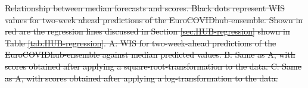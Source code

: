 \documentclass[10pt,letterpaper]{article} %
\providecommand{\DIFdeltex}[1]{{\protect\color{red}\sout{#1}}}                      %
\providecommand{\DIFdelbegin}{} %
\providecommand{\DIFdelFL}[1]{\DIFdel{#1}} %
\providecommand{\DIFdel}[1]{\texorpdfstring{\DIFdeltex{#1}}{}} %
\newcommand{\DIFscaledelfig}{0.5}
\newlength{\DIFdelgraphicswidth} %
\newlength{\DIFdelgraphicsheight} %
\newcommand{\DIFdelincludegraphics}[2][]{%
\sbox{\DIFdelgraphicsbox}{\DIFOincludegraphics[#1]{#2}}%
\settoboxwidth{\DIFdelgraphicswidth}{\DIFdelgraphicsbox} %
\settoboxtotalheight{\DIFdelgraphicsheight}{\DIFdelgraphicsbox} %
\scalebox{\DIFscaledelfig}{%
\parbox[b]{\DIFdelgraphicswidth}{\usebox{\DIFdelgraphicsbox}\\[-\baselineskip] \rule{\DIFdelgraphicswidth}{0em}}\llap{\resizebox{\DIFdelgraphicswidth}{\DIFdelgraphicsheight}{%
\setlength{\unitlength}{\DIFdelgraphicswidth}%
\begin{picture}(1,1)%
\thicklines\linethickness{2pt} %
{\color[rgb]{1,0,0}\put(0,0){\framebox(1,1){}}}%
{\color[rgb]{1,0,0}\put(0,0){\line( 1,1){1}}}%
{\color[rgb]{1,0,0}\put(0,1){\line(1,-1){1}}}%
\end{picture}%
}\hspace*{3pt}}} %
} %
\DeclareRobustCommand{\DIFdelbegin}{\DIFOdelbegin \let\includegraphics\DIFdelincludegraphics} %
\begin{document}
\DIFdelbegin %
{%
\DIFdelFL{Relationship between median forecasts and scores. Black dots represent WIS values for two-week ahead predictions of the EuroCOVIDhub-ensemble. Shown in red are the regression lines discussed in Section \ref{sec:HUB-regression} shown in Table \ref{tab:HUB-regression}. A: WIS for two-week-ahead predictions of the EuroCOVIDhub-ensemble against median predicted values. B: Same as A, with scores obtained after applying a square-root-transformation to the data. C: Same as A, with scores obtained after applying a log-transformation to the data.}} 
\end{document}

